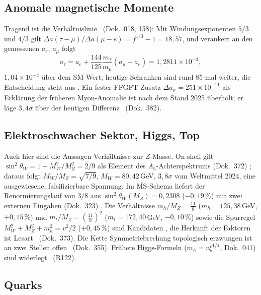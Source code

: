 \subsection{Anomale magnetische Momente}

Tragend ist die Verhältnislinie \KM\ (Dok.~018, 158): Mit Windungsexponenten $5/3$ und $4/3$ gilt
$\Delta a(\tau{-}\mu)/\Delta a(\mu{-}e)=f^{1/3}-1=18{,}57$, und verankert an den gemessenen
$a_e$, $a_\mu$ folgt
\begin{equation}
  a_\tau=a_e+\frac{144}{125}\frac{m_\tau}{m_\mu}(a_\mu-a_e)=1{,}2811\times10^{-3},
\end{equation}
$1{,}04\times10^{-4}$ über dem SM-Wert; heutige Schranken sind rund 85-mal weiter, die
Entscheidung steht aus \SM. Ein fester FFGFT-Zusatz $\Delta a_\mu=251\times10^{-11}$ als
Erklärung der früheren Myon-Anomalie ist nach dem Stand 2025 überholt; er läge $3{,}4\sigma$
über der heutigen Differenz \XM\ (Dok.~382).

\subsection{Elektroschwacher Sektor, Higgs, Top}

Auch hier sind die Aussagen Verhältnisse zur $Z$-Masse. On-shell gilt
$\sin^2\theta_W=1-M_W^2/M_Z^2=2/9$ als Element des $A_5$-Achterspektrums (Dok.~372) \KM; daraus
folgt $M_W/M_Z=\sqrt{7/9}$, $M_W=80{,}42$\,GeV, $3{,}8\sigma$ vom Weltmittel 2024, eine
ausgewiesene, falsifizierbare Spannung. Im $\overline{\text{MS}}$-Schema liefert der
Renormierungslauf von $3/8$ aus $\sin^2\theta_W(M_Z)=0{,}2308$ ($-0{,}19\,\%$) mit zwei externen
Eingaben (Dok.~323) \KM. Die Verhältnisse $m_h/M_Z=\tfrac{11}{8}$ ($m_h=125{,}38$\,GeV,
$+0{,}15\,\%$) und $m_t/M_Z=(\tfrac{11}{8})^2$ ($m_t=172{,}40$\,GeV, $-0{,}10\,\%$) sowie die
Spurregel $M_W^2+M_Z^2+m_h^2=v^2/2$ ($+0{,}45\,\%$) sind Kandidaten \KM, die Herkunft der Faktoren
ist Lesart \SM\ (Dok.~373). Die Kette \glqq Symmetriebrechung topologisch erzwungen\grqq{} ist an
zwei Stellen offen \SM\ (Dok.~355). Frühere Higgs-Formeln ($m_h=v\xi^{1/4}$, Dok.~041) sind
widerlegt \XM\ (R122).

\subsection{Quarks}

